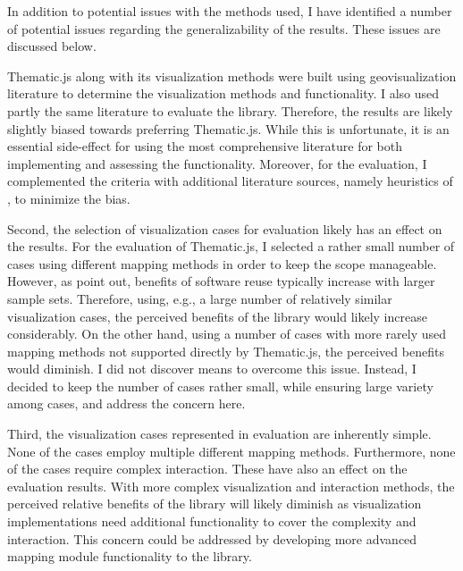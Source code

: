 In addition to potential issues with the methods used, I have identified a number of potential issues regarding the generalizability of the results. These issues are discussed below.

Thematic.js along with its visualization methods were built using geovisualization literature to determine the visualization methods and functionality. I also used partly the same literature to evaluate the library. Therefore, the results are likely slightly biased towards preferring Thematic.js. While this is unfortunate, it is an essential side-effect for using the most comprehensive literature for both implementing and assessing the functionality. Moreover, for the evaluation, I complemented the criteria with additional literature sources, namely heuristics of \citet{zuk_heuristics_2006}, to minimize the bias.

Second, the selection of visualization cases for evaluation likely has an effect on the results. For the evaluation of Thematic.js, I selected a rather small number of cases using different mapping methods in order to keep the scope manageable. However, as \citet{frakes_success_1994} point out, benefits of software reuse typically increase with larger sample sets. Therefore, using, e.g., a large number of relatively similar visualization cases, the perceived benefits of the library would likely increase considerably. On the other hand, using a number of cases with more rarely used mapping methods not supported directly by Thematic.js, the perceived benefits would diminish. I did not discover means to overcome this issue. Instead, I decided to keep the number of cases rather small, while ensuring large variety among cases, and address the concern here.

Third, the visualization cases represented in evaluation are inherently simple. None of the cases employ multiple different mapping methods. Furthermore, none of the cases require complex interaction. These have also an effect on the evaluation results. With more complex visualization and interaction methods, the perceived relative benefits of the library will likely diminish as visualization implementations need additional functionality to cover the complexity and interaction. This concern could be addressed by developing more advanced mapping module functionality to the library.


